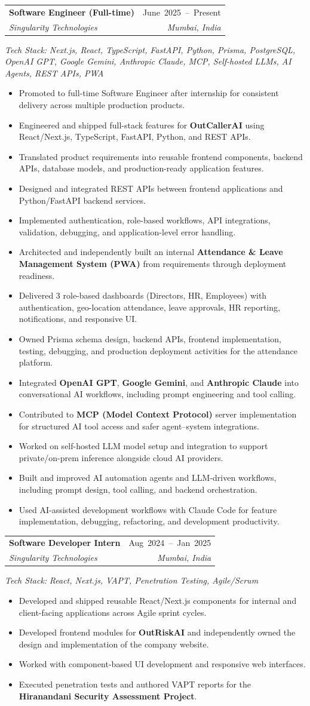 \documentclass[a4paper,10pt]{article}
\makeatletter
\newcommand{\resumeItem}[1]{\item \small{#1}}
\newcommand{\resumeSubheading}[4]{
  \vspace{3pt}\item
    \begin{tabular*}{\textwidth}[t]{l@{\extracolsep{\fill}}r}
      \textbf{#1} & \small\mbox{#2} \\
      \textit{\small\color{MutedText}#3} & \textit{\small\color{MutedText}#4} \\
    \end{tabular*}
  \vspace{1pt}
}
\newcommand{\resumeTechStack}[1]{
  \item[]{\footnotesize\textit{\color{MutedText}Tech Stack:} \textit{\color{MutedText}#1}}
}
\newcommand{\resumeItemListStart}{\begin{itemize}[leftmargin=0.18in, label=\textbullet, itemsep=2.5pt]}
\newcommand{\resumeItemListEnd}{\end{itemize}}
\makeatother
\begin{document}
\resumeSubheading
{Software Engineer (Full-time)}{June 2025 -- Present}
{Singularity Technologies}{Mumbai, India}
\resumeTechStack{Next.js, React, TypeScript, FastAPI, Python, Prisma, PostgreSQL, OpenAI GPT, Google Gemini, Anthropic Claude, MCP, Self-hosted LLMs, AI Agents, REST APIs, PWA}
\resumeItemListStart
\resumeItem{Promoted to full-time Software Engineer after internship for consistent delivery across multiple production products.}
\resumeItem{Engineered and shipped full-stack features for \textbf{OutCallerAI} using React/Next.js, TypeScript, FastAPI, Python, and REST APIs.}
\resumeItem{Translated product requirements into reusable frontend components, backend APIs, database models, and production-ready application features.}
\resumeItem{Designed and integrated REST APIs between frontend applications and Python/FastAPI backend services.}
\resumeItem{Implemented authentication, role-based workflows, API integrations, validation, debugging, and application-level error handling.}
\resumeItem{Architected and independently built an internal \textbf{Attendance \& Leave Management System (PWA)} from requirements through deployment readiness.}
\resumeItem{Delivered 3 role-based dashboards (Directors, HR, Employees) with authentication, geo-location attendance, leave approvals, HR reporting, notifications, and responsive UI.}
\resumeItem{Owned Prisma schema design, backend APIs, frontend implementation, testing, debugging, and production deployment activities for the attendance platform.}
\resumeItem{Integrated \textbf{OpenAI GPT}, \textbf{Google Gemini}, and \textbf{Anthropic Claude} into conversational AI workflows, including prompt engineering and tool calling.}
\resumeItem{Contributed to \textbf{MCP (Model Context Protocol)} server implementation for structured AI tool access and safer agent--system integrations.}
\resumeItem{Worked on self-hosted LLM model setup and integration to support private/on-prem inference alongside cloud AI providers.}
\resumeItem{Built and improved AI automation agents and LLM-driven workflows, including prompt design, tool calling, and backend orchestration.}
\resumeItem{Used AI-assisted development workflows with Claude Code for feature implementation, debugging, refactoring, and development productivity.}
\resumeItemListEnd

\resumeSubheading
{Software Developer Intern}{Aug 2024 -- Jan 2025}
{Singularity Technologies}{Mumbai, India}
\resumeTechStack{React, Next.js, VAPT, Penetration Testing, Agile/Scrum}
\resumeItemListStart
\resumeItem{Developed and shipped reusable React/Next.js components for internal and client-facing applications across Agile sprint cycles.}
\resumeItem{Developed frontend modules for \textbf{OutRiskAI} and independently owned the design and implementation of the company website.}
\resumeItem{Worked with component-based UI development and responsive web interfaces.}
\resumeItem{Executed penetration tests and authored VAPT reports for the \textbf{Hiranandani Security Assessment Project}.}
\resumeItemListEnd
\end{document}
